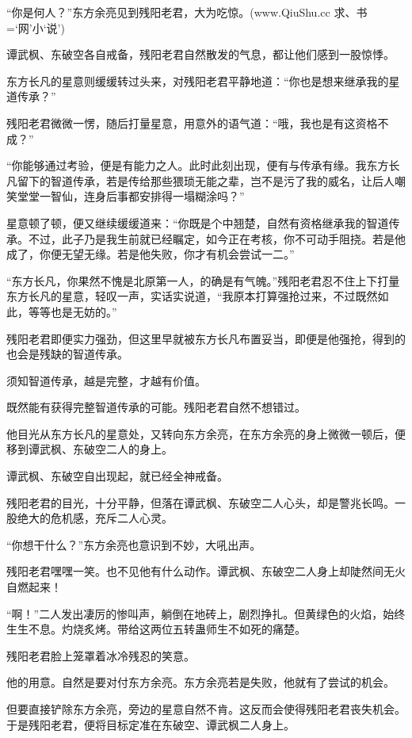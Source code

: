 
\begin{this_body}

“你是何人？”东方余亮见到残阳老君，大为吃惊。(www.QiuShu.cc 求、书=‘网’小‘说’)

谭武枫、东破空各自戒备，残阳老君自然散发的气息，都让他们感到一股惊悸。

东方长凡的星意则缓缓转过头来，对残阳老君平静地道：“你也是想来继承我的星道传承？”

残阳老君微微一愣，随后打量星意，用意外的语气道：“哦，我也是有这资格不成？”

“你能够通过考验，便是有能力之人。此时此刻出现，便有与传承有缘。我东方长凡留下的智道传承，若是传给那些猥琐无能之辈，岂不是污了我的威名，让后人嘲笑堂堂一智仙，连身后事都安排得一塌糊涂吗？”

星意顿了顿，便又继续缓缓道来：“你既是个中翘楚，自然有资格继承我的智道传承。不过，此子乃是我生前就已经瞩定，如今正在考核，你不可动手阻挠。若是他成了，你便无望无缘。若是他失败，你才有机会尝试一二。”

“东方长凡，你果然不愧是北原第一人，的确是有气魄。”残阳老君忍不住上下打量东方长凡的星意，轻叹一声，实话实说道，“我原本打算强抢过来，不过既然如此，等等也是无妨的。”

残阳老君即便实力强劲，但这里早就被东方长凡布置妥当，即便是他强抢，得到的也会是残缺的智道传承。

须知智道传承，越是完整，才越有价值。

既然能有获得完整智道传承的可能。残阳老君自然不想错过。

他目光从东方长凡的星意处，又转向东方余亮，在东方余亮的身上微微一顿后，便移到谭武枫、东破空二人的身上。

谭武枫、东破空自出现起，就已经全神戒备。

残阳老君的目光，十分平静，但落在谭武枫、东破空二人心头，却是警兆长鸣。一股绝大的危机感，充斥二人心灵。

“你想干什么？”东方余亮也意识到不妙，大吼出声。

残阳老君嘿嘿一笑。也不见他有什么动作。谭武枫、东破空二人身上却陡然间无火自燃起来！

“啊！”二人发出凄厉的惨叫声，躺倒在地砖上，剧烈挣扎。但黄绿色的火焰，始终生生不息。灼烧炙烤。带给这两位五转蛊师生不如死的痛楚。

残阳老君脸上笼罩着冰冷残忍的笑意。

他的用意。自然是要对付东方余亮。东方余亮若是失败，他就有了尝试的机会。

但要直接铲除东方余亮，旁边的星意自然不肯。这反而会使得残阳老君丧失机会。于是残阳老君，便将目标定准在东破空、谭武枫二人身上。


\end{this_body}
